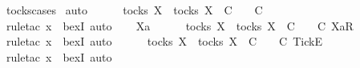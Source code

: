 \begin{isabellebody}
\ tocks{\isachardot}cases\isanewline
{}\isamarkupfalse%
\ auto\isanewline
\ \ \isamarkupfalse%
\ {\isachardoublequoteopen}{\isacharbrackleft}{\isacharbrackright}\ {\isasymin}\ tocks\ X\ {\isasymLongrightarrow}\ {\isasymexists}{\isasymrho}{\isacharprime}{\isasymin}tocks\ X{\isachardot}\ {\isasymrho}{\isacharprime}\ {\isasymsubseteq}\isactrlsub C\ {\isacharbrackleft}{\isacharbrackright}\ {\isasymand}\ {\isasymrho}{\isacharprime}\ {\isasymle}\isactrlsub C\ {\isacharbrackleft}{\isacharbrackright}{\isachardoublequoteclose}\isanewline
\ \ \ \ \isamarkupfalse%
\ {\isacharparenleft}rule{\isacharunderscore}tac\ x{\isacharequal}{\isachardoublequoteopen}{\isacharbrackleft}{\isacharbrackright}{\isachardoublequoteclose}\ \ bexI{\isacharcomma}\ auto{\isacharparenright}\isanewline
{}\isamarkupfalse%
\isanewline
\ \ \isamarkupfalse%
\ Xa\isanewline
\ \ \isamarkupfalse%
\ {\isachardoublequoteopen}{\isacharbrackleft}{\isacharbrackright}\ {\isasymin}\ tocks\ X\ {\isasymLongrightarrow}\ {\isasymexists}{\isasymrho}{\isacharprime}{\isasymin}tocks\ X{\isachardot}\ {\isasymrho}{\isacharprime}\ {\isasymsubseteq}\isactrlsub C\ {\isacharbrackleft}{\isacharbrackright}\ {\isasymand}\ {\isasymrho}{\isacharprime}\ {\isasymle}\isactrlsub C\ {\isacharbrackleft}{\isacharbrackleft}Xa{\isacharbrackright}\isactrlsub R{\isacharbrackright}{\isachardoublequoteclose}\isanewline
\ \ \ \ \isamarkupfalse%
\ {\isacharparenleft}rule{\isacharunderscore}tac\ x{\isacharequal}{\isachardoublequoteopen}{\isacharbrackleft}{\isacharbrackright}{\isachardoublequoteclose}\ \ bexI{\isacharcomma}\ auto{\isacharparenright}\isanewline
{}\isamarkupfalse%
\isanewline
\ \ \isamarkupfalse%
\ {\isachardoublequoteopen}{\isacharbrackleft}{\isacharbrackright}\ {\isasymin}\ tocks\ X\ {\isasymLongrightarrow}\ {\isasymexists}{\isasymrho}{\isacharprime}{\isasymin}tocks\ X{\isachardot}\ {\isasymrho}{\isacharprime}\ {\isasymsubseteq}\isactrlsub C\ {\isacharbrackleft}{\isacharbrackright}\ {\isasymand}\ {\isasymrho}{\isacharprime}\ {\isasymle}\isactrlsub C\ {\isacharbrackleft}{\isacharbrackleft}Tick{\isacharbrackright}\isactrlsub E{\isacharbrackright}{\isachardoublequoteclose}\isanewline
\ \ \ \ \isamarkupfalse%
\ {\isacharparenleft}rule{\isacharunderscore}tac\ x{\isacharequal}{\isachardoublequoteopen}{\isacharbrackleft}{\isacharbrackright}{\isachardoublequoteclose}\ \ bexI{\isacharcomma}\ auto{\isacharparenright}\isanewline
{}\isamarkupfalse%

\end{isabellebody}
